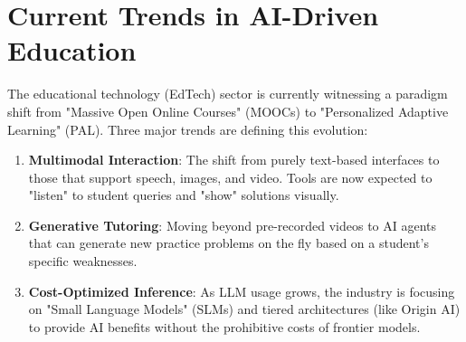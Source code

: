 \begin{table}[H]
\centering
\caption{Comparative Analysis of AI Mentorship Solutions}
\label{tab:comparison}
\renewcommand{\arraystretch}{1.6}
\setlength{\tabcolsep}{10pt}
\end{table}

\section{Current Trends in AI-Driven Education}

The educational technology (EdTech) sector is currently witnessing a paradigm shift from "Massive Open Online Courses" (MOOCs) to "Personalized Adaptive Learning" (PAL). Three major trends are defining this evolution:

\begin{enumerate}
    \item \textbf{Multimodal Interaction}: The shift from purely text-based interfaces to those that support speech, images, and video. Tools are now expected to "listen" to student queries and "show" solutions visually.
    \item \textbf{Generative Tutoring}: Moving beyond pre-recorded videos to AI agents that can generate new practice problems on the fly based on a student's specific weaknesses.
    \item \textbf{Cost-Optimized Inference}: As LLM usage grows, the industry is focusing on "Small Language Models" (SLMs) and tiered architectures (like Origin AI) to provide AI benefits without the prohibitive costs of frontier models.
\end{enumerate}

